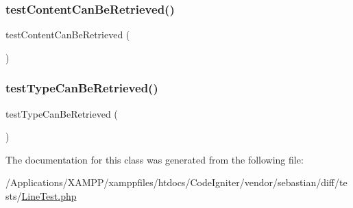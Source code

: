 \subsubsection{\texorpdfstring{test\+Content\+Can\+Be\+Retrieved()}{testContentCanBeRetrieved()}}
{\footnotesize\ttfamily test\+Content\+Can\+Be\+Retrieved (\begin{DoxyParamCaption}{ }\end{DoxyParamCaption})}

\mbox{\label{class_sebastian_bergmann_1_1_diff_1_1_line_test_a52d0671790deca83324471d8c1a28065}} 
\subsubsection{\texorpdfstring{test\+Type\+Can\+Be\+Retrieved()}{testTypeCanBeRetrieved()}}
{\footnotesize\ttfamily test\+Type\+Can\+Be\+Retrieved (\begin{DoxyParamCaption}{ }\end{DoxyParamCaption})}



The documentation for this class was generated from the following file\+:\begin{DoxyCompactItemize}
\item 
/\+Applications/\+X\+A\+M\+P\+P/xamppfiles/htdocs/\+Code\+Igniter/vendor/sebastian/diff/tests/\mbox{\hyperlink{_line_test_8php}{Line\+Test.\+php}}\end{DoxyCompactItemize}
